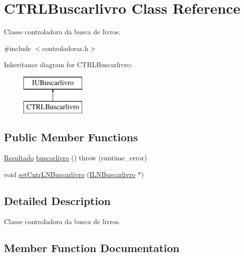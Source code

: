 \hypertarget{classCTRLBuscarlivro}{}\section{C\+T\+R\+L\+Buscarlivro Class Reference}
\label{classCTRLBuscarlivro}


Classe controladora da busca de livros.  




{\ttfamily \#include $<$controladoras.\+h$>$}

Inheritance diagram for C\+T\+R\+L\+Buscarlivro\+:\begin{figure}[H]
\begin{center}
\leavevmode
\includegraphics[height=2.000000cm]{classCTRLBuscarlivro}
\end{center}
\end{figure}
\subsection*{Public Member Functions}
\begin{DoxyCompactItemize}
\item 
\hyperlink{classResultado}{Resultado} \hyperlink{classCTRLBuscarlivro_ade2ee03bc32f28ea54ba771e1b69c482}{buscarlivro} ()  throw (runtime\+\_\+error)
\item 
void \hyperlink{classCTRLBuscarlivro_ae0022d7cf6df4d7f66a209929e7d8f53}{set\+Cntr\+L\+N\+Buscarlivro} (\hyperlink{classILNBuscarlivro}{I\+L\+N\+Buscarlivro} $\ast$)
\end{DoxyCompactItemize}


\subsection{Detailed Description}
Classe controladora da busca de livros. 

\subsection{Member Function Documentation}
\mbox{\label{classCTRLBuscarlivro_ade2ee03bc32f28ea54ba771e1b69c482}} 
